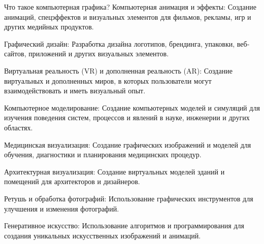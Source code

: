 \documentclass{beamer}
\begin{document}
\begin{frame}{Что такое компьютерная графика?}
		Компьютерная анимация и эффекты: Создание анимаций, спецэффектов и визуальных элементов для фильмов, рекламы, игр и других медийных продуктов.
		
		Графический дизайн: Разработка дизайна логотипов, брендинга, упаковки, веб-сайтов, приложений и других визуальных элементов.
		
		Виртуальная реальность (VR) и дополненная реальность (AR): Создание виртуальных и дополненных миров, в которых пользователи могут взаимодействовать и иметь визуальный опыт.
		
		Компьютерное моделирование: Создание компьютерных моделей и симуляций для изучения поведения систем, процессов и явлений в науке, инженерии и других областях.
		
		Медицинская визуализация: Создание графических изображений и моделей для обучения, диагностики и планирования медицинских процедур.
		
		Архитектурная визуализация: Создание виртуальных моделей зданий и помещений для архитекторов и дизайнеров.
		
		Ретушь и обработка фотографий: Использование графических инструментов для улучшения и изменения фотографий.
		
		Генеративное искусство: Использование алгоритмов и программирования для создания уникальных искусственных изображений и анимаций.
		\fi
		
	\end{frame}
	
\end{document}
